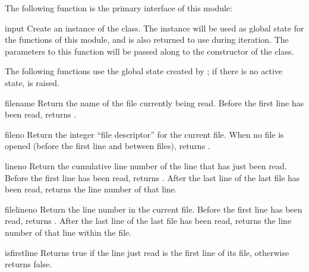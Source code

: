 The following function is the primary interface of this module:

\begin{funcdesc}{input}{}
  Create an instance of the  class.  The instance
  will be used as global state for the functions of this module, and
  is also returned to use during iteration.  The parameters to this
  function will be passed along to the constructor of the
   class.

\end{funcdesc}


The following functions use the global state created by
; if there is no active state,
 is raised.

\begin{funcdesc}{filename}{}
  Return the name of the file currently being read.  Before the first
  line has been read, returns .
\end{funcdesc}

\begin{funcdesc}{fileno}{}
  Return the integer ``file descriptor'' for the current file. When no
  file is opened (before the first line and between files), returns
  .
\end{funcdesc}

\begin{funcdesc}{lineno}{}
  Return the cumulative line number of the line that has just been
  read.  Before the first line has been read, returns .  After
  the last line of the last file has been read, returns the line
  number of that line.
\end{funcdesc}

\begin{funcdesc}{filelineno}{}
  Return the line number in the current file.  Before the first line
  has been read, returns .  After the last line of the last
  file has been read, returns the line number of that line within the
  file.
\end{funcdesc}

\begin{funcdesc}{isfirstline}{}
  Returns true if the line just read is the first line of its file,
  otherwise returns false.
\end{funcdesc}


